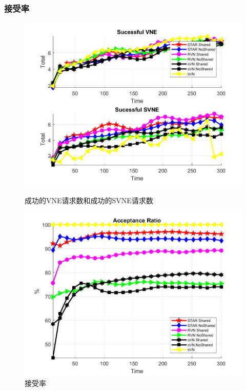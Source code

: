 \begin{frame}
\frametitle{接受率}
\begin{figure}[htbp]
\centering
\begin{minipage}{0.4\textwidth}
\centering
\includegraphics[width=\textwidth]{figures/VirNetReqSurNetReq}
\caption{成功的VNE请求数和成功的SVNE请求数}\label{fig:VirNetReqSurNetReq}
\end{minipage}
\begin{minipage}{0.4\textwidth}
\centering
\includegraphics[width=\textwidth]{figures/AcceptionRatio}
\caption{接受率}\label{fig:AcceptionRatio}
\end{minipage}\vspace{\baselineskip}
\end{figure}
\end{frame}


